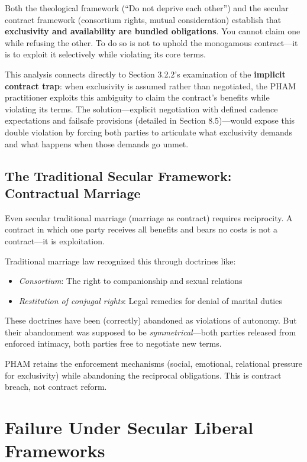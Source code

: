 \documentclass[12pt,openany]{book}
\numberwithin{equation}{chapter}
\begin{document}
Both the theological framework (``Do not deprive each other'') and the secular contract framework (consortium rights, mutual consideration) establish that \textbf{exclusivity and availability are bundled obligations}. You cannot claim one while refusing the other. To do so is not to uphold the monogamous contract---it is to exploit it selectively while violating its core terms.

This analysis connects directly to Section 3.2.2's examination of the \textbf{implicit contract trap}: when exclusivity is assumed rather than negotiated, the PHAM practitioner exploits this ambiguity to claim the contract's benefits while violating its terms. The solution---explicit negotiation with defined cadence expectations and failsafe provisions (detailed in Section 8.5)---would expose this double violation by forcing both parties to articulate what exclusivity demands and what happens when those demands go unmet.

\subsection{The Traditional Secular Framework: Contractual Marriage}

Even secular traditional marriage (marriage as contract) requires reciprocity. A contract in which one party receives all benefits and bears no costs is not a contract---it is exploitation.

Traditional marriage law recognized this through doctrines like:
\begin{itemize}
    \item \textit{Consortium}: The right to companionship and sexual relations
    \item \textit{Restitution of conjugal rights}: Legal remedies for denial of marital duties
\end{itemize}

These doctrines have been (correctly) abandoned as violations of autonomy. But their abandonment was supposed to be \textit{symmetrical}---both parties released from enforced intimacy, both parties free to negotiate new terms.

PHAM retains the enforcement mechanisms (social, emotional, relational pressure for exclusivity) while abandoning the reciprocal obligations. This is contract breach, not contract reform.

\section{Failure Under Secular Liberal Frameworks}
\end{document}
